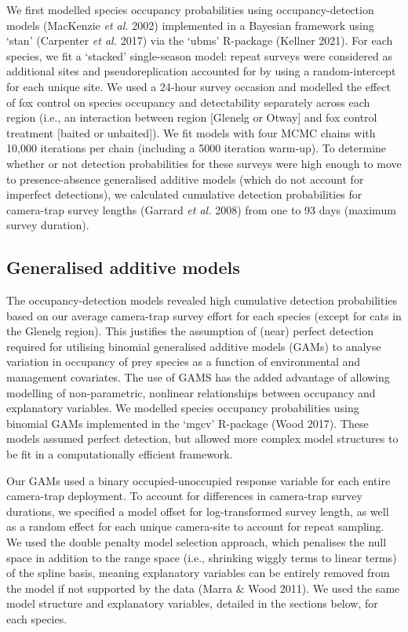 \documentclass[11pt,a4paper,titlepage,twoside,openright]{style/unimelbthesis}
\begin{document}
\begin{mainmatter}
We first modelled species occupancy probabilities using occupancy-detection models (MacKenzie \emph{et al.} 2002) implemented in a Bayesian framework using `stan' (Carpenter \emph{et al.} 2017) via the `ubms' R-package (Kellner 2021). For each species, we fit a `stacked' single-season model: repeat surveys were considered as additional sites and pseudoreplication accounted for by using a random-intercept for each unique site. We used a 24-hour survey occasion and modelled the effect of fox control on species occupancy and detectability separately across each region (i.e., an interaction between region {[}Glenelg or Otway{]} and fox control treatment {[}baited or unbaited{]}). We fit models with four MCMC chains with 10,000 iterations per chain (including a 5000 iteration warm-up). To determine whether or not detection probabilities for these surveys were high enough to move to presence-absence generalised additive models (which do not account for imperfect detections), we calculated cumulative detection probabilities for camera-trap survey lengths (Garrard \emph{et al.} 2008) from one to 93 days (maximum survey duration).

\hypertarget{generalised-additive-models}{%
\subsection{Generalised additive models}\label{generalised-additive-models}}

The occupancy-detection models revealed high cumulative detection probabilities based on our average camera-trap survey effort for each species (except for cats in the Glenelg region). This justifies the assumption of (near) perfect detection required for utilising binomial generalised additive models (GAMs) to analyse variation in occupancy of prey species as a function of environmental and management covariates. The use of GAMS has the added advantage of allowing modelling of non-parametric, nonlinear relationships between occupancy and explanatory variables. We modelled species occupancy probabilities using binomial GAMs implemented in the `mgcv' R-package (Wood 2017). These models assumed perfect detection, but allowed more complex model structures to be fit in a computationally efficient framework.

Our GAMs used a binary occupied-unoccupied response variable for each entire camera-trap deployment. To account for differences in camera-trap survey durations, we specified a model offset for log-transformed survey length, as well as a random effect for each unique camera-site to account for repeat sampling. We used the double penalty model selection approach, which penalises the null space in addition to the range space (i.e., shrinking wiggly terms to linear terms) of the spline basis, meaning explanatory variables can be entirely removed from the model if not supported by the data (Marra \& Wood 2011). We used the same model structure and explanatory variables, detailed in the sections below, for each species.


\end{mainmatter}
\end{document}
